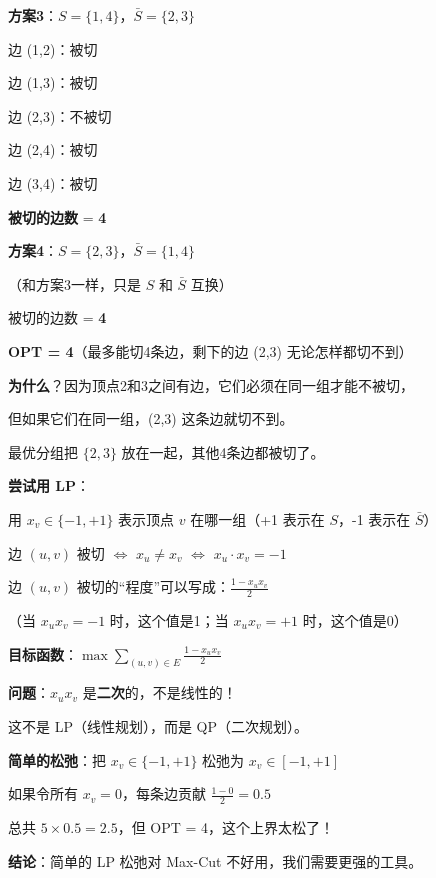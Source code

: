\documentclass[12pt, a4paper]{ctexart}
\begin{document}
\begin{blackboard}[继续枚举]

\textbf{方案3}：$S = \{1, 4\}$，$\bar{S} = \{2, 3\}$

边 (1,2)：被切 \checkmark

边 (1,3)：被切 \checkmark

边 (2,3)：不被切

边 (2,4)：被切 \checkmark

边 (3,4)：被切 \checkmark

\textbf{被切的边数} = \textbf{4}

\textbf{方案4}：$S = \{2, 3\}$，$\bar{S} = \{1, 4\}$

（和方案3一样，只是 $S$ 和 $\bar{S}$ 互换）

被切的边数 = \textbf{4}

\textbf{OPT = 4}（最多能切4条边，剩下的边 (2,3) 无论怎样都切不到）

\textbf{为什么}？因为顶点2和3之间有边，它们必须在同一组才能不被切，

但如果它们在同一组，(2,3) 这条边就切不到。

最优分组把 $\{2, 3\}$ 放在一起，其他4条边都被切了。

\end{blackboard}

\begin{blackboard}

\textbf{尝试用 LP}：

用 $x_v \in \{-1, +1\}$ 表示顶点 $v$ 在哪一组（+1 表示在 $S$，-1 表示在 $\bar{S}$）

边 $(u, v)$ 被切 $\Leftrightarrow$ $x_u \neq x_v$ $\Leftrightarrow$ $x_u \cdot x_v = -1$

边 $(u, v)$ 被切的``程度''可以写成：$\frac{1 - x_u x_v}{2}$

（当 $x_u x_v = -1$ 时，这个值是1；当 $x_u x_v = +1$ 时，这个值是0）

\textbf{目标函数}：$\max \sum_{(u,v) \in E} \frac{1 - x_u x_v}{2}$

\textbf{问题}：$x_u x_v$ 是\textbf{二次}的，不是线性的！

这不是 LP（线性规划），而是 QP（二次规划）。

\textbf{简单的松弛}：把 $x_v \in \{-1, +1\}$ 松弛为 $x_v \in [-1, +1]$

如果令所有 $x_v = 0$，每条边贡献 $\frac{1 - 0}{2} = 0.5$

总共 $5 \times 0.5 = 2.5$，但 OPT = 4，这个上界太松了！

\textbf{结论}：简单的 LP 松弛对 Max-Cut 不好用，我们需要更强的工具。

\end{blackboard}
\end{document}
